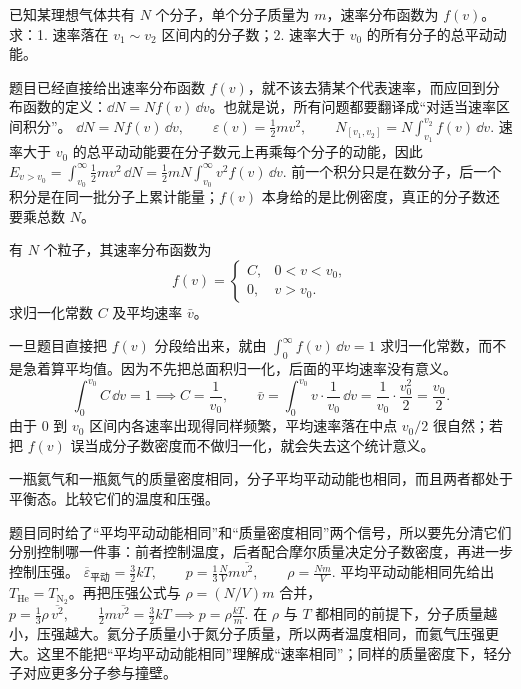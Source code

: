 \documentclass[lang=cn,11pt]{elegantbook}
\begin{document}
\begin{exercise}[已知分布函数时怎样从区间数到总能量]
已知某理想气体共有 \(N\) 个分子，单个分子质量为 \(m\)，速率分布函数为 \(f(v)\)。求：1. 速率落在 \(v_1\sim v_2\) 区间内的分子数；2. 速率大于 \(v_0\) 的所有分子的总平动动能。
\end{exercise}

\begin{solution}
题目已经直接给出速率分布函数 \(f(v)\)，就不该去猜某个代表速率，而应回到分布函数的定义：\(\dd N=Nf(v)\,\dd v\)。也就是说，所有问题都要翻译成“对适当速率区间积分”。
 \(\dd N=Nf(v)\,\dd v,\qquad \varepsilon(v)=\frac12mv^2,\qquad N_{[v_1,v_2]}=N\int_{v_1}^{v_2}f(v)\,\dd v.\) 
速率大于 \(v_0\) 的总平动动能要在分子数元上再乘每个分子的动能，因此
 \(E_{v>v_0} =\int_{v_0}^{\infty}\frac12 mv^2\,\dd N =\frac12 mN\int_{v_0}^{\infty}v^2f(v)\,\dd v.\) 
前一个积分只是在数分子，后一个积分是在同一批分子上累计能量；\(f(v)\) 本身给的是比例密度，真正的分子数还要乘总数 \(N\)。
\end{solution}

\begin{exercise}[分段常数分布函数怎样先归一化再求平均速率]
有 \(N\) 个粒子，其速率分布函数为
\[
f(v)=
\begin{cases}
C,&0<v<v_0,\\
0,&v>v_0.
\end{cases}
\]
求归一化常数 \(C\) 及平均速率 \(\bar v\)。
\end{exercise}

\begin{solution}
一旦题目直接把 \(f(v)\) 分段给出来，就由
 \(\int_0^\infty f(v)\,\dd v=1\) 
求归一化常数，而不是急着算平均值。因为不先把总面积归一化，后面的平均速率没有意义。
\[
\int_0^{v_0}C\,\dd v=1\implies C=\frac1{v_0},\qquad
\bar v=\int_0^{v_0} v\cdot \frac{1}{v_0}\,\dd v
=\frac{1}{v_0}\cdot \frac{v_0^2}{2}
=\frac{v_0}{2}.
\]
由于 \(0\) 到 \(v_0\) 区间内各速率出现得同样频繁，平均速率落在中点 \(v_0/2\) 很自然；若把 \(f(v)\) 误当成分子数密度而不做归一化，就会失去这个统计意义。
\end{solution}

\begin{exercise}[同温下氦气和氮气为什么压强不同]
一瓶氦气和一瓶氮气的质量密度相同，分子平均平动动能也相同，而且两者都处于平衡态。比较它们的温度和压强。
\end{exercise}

\begin{solution}
题目同时给了“平均平动动能相同”和“质量密度相同”两个信号，所以要先分清它们分别控制哪一件事：前者控制温度，后者配合摩尔质量决定分子数密度，再进一步控制压强。
 \(\overline{\varepsilon}_{\text{平动}}=\frac32 kT,\qquad p=\frac13\frac{N}{V}m\overline{v^2},\qquad \rho=\frac{Nm}{V}.\) 
平均平动动能相同先给出 \(T_{\mathrm{He}}=T_{\mathrm{N_2}}\)。再把压强公式与 \(\rho=(N/V)m\) 合并，
 \(p=\frac13\rho\,\overline{v^2},\qquad \frac12m\overline{v^2}=\frac32kT \implies p=\rho\frac{kT}{m}.\) 
在 \(\rho\) 与 \(T\) 都相同的前提下，分子质量越小，压强越大。氦分子质量小于氮分子质量，所以两者温度相同，而氦气压强更大。这里不能把“平均平动动能相同”理解成“速率相同”；同样的质量密度下，轻分子对应更多分子参与撞壁。
\end{solution}
\end{document}
